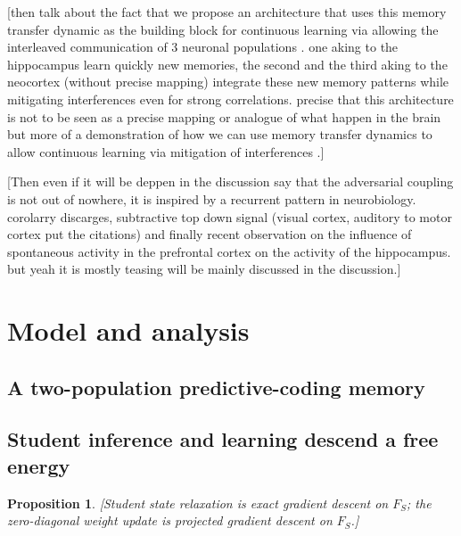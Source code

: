 \documentclass[10pt,letterpaper]{article}
\theoremstyle{plain}
\newtheorem{proposition}{Proposition}
\theoremstyle{remark}
\begin{document}
[then talk about the fact that we propose an architecture that uses this memory transfer dynamic as the building block for continuous learning via allowing the interleaved communication of 3 neuronal populations . one aking to the hippocampus learn quickly new memories, the second and the third aking to the neocortex (without precise mapping) integrate these new memory patterns while mitigating interferences even for strong correlations. precise that this architecture is not to be seen as a precise mapping or analogue of what happen in the brain but more of a demonstration of how we can use memory transfer dynamics to allow continuous learning via mitigation of interferences .]

[Then even if it will be deppen in the discussion say that the adversarial coupling is not out of nowhere, it is inspired by a recurrent pattern in neurobiology. corolarry discarges, subtractive top down signal (visual cortex, auditory to motor cortex put the citations) and finally recent observation on the influence of spontaneous activity in the prefrontal cortex on the activity of the hippocampus. but yeah it is mostly teasing will be mainly discussed in the discussion.]

\section{Model and analysis}

\subsection{A two-population predictive-coding memory}

\subsection{Student inference and learning descend a free energy}
\begin{proposition}\label{prop:descent}
\textit{[Student state relaxation is exact gradient descent on $F_S$; the
zero-diagonal weight update is projected gradient descent on $F_S$.]}
\end{proposition}
\end{document}

